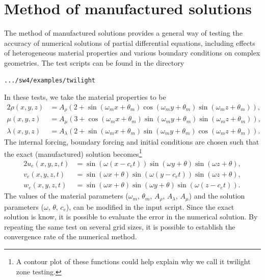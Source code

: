 \documentclass[11pt]{report}
\begin{document}
\section{Method of manufactured solutions}\label{sec:twilight}

The method of manufactured solutions provides a general way of testing the accuracy of numerical
solutions of partial differential equations, including effects of heterogeneous material properties
and various boundary conditions on complex geometries. The test scripts can be found in the
directory
\begin{verbatim}
.../sw4/examples/twilight
\end{verbatim}
In these tests, we take the material properties to be
\begin{alignat*}{2}
\rho(x,y,z) &= A_\rho \left( 2 + \sin(\omega_m x + \theta_m) \cos(\omega_m y + \theta_m)
\sin(\omega_m z + \theta_m) \right),\\ 
\mu(x,y,z) &=  A_\mu \left( 3 + \cos(\omega_m x + \theta_m) \sin(\omega_m y + \theta_m)
\sin(\omega_m z + \theta_m) \right),\\ 
\lambda(x,y,z) &=  A_\lambda \left( 2 + \sin(\omega_m x + \theta_m) \sin(\omega_m y + \theta_m)
\cos(\omega_m z + \theta_m) \right).
\end{alignat*}
The internal forcing, boundary forcing and initial conditions are chosen such that the exact
(manufactured) solution becomes\footnote{A contour plot of these functions could help explain why we
  call it twilight zone testing.}
\begin{alignat*}{2}
u_e(x,y,z,t) &= \sin(\omega(x-c_e t)) \sin(\omega y + \theta) \sin(\omega z + \theta), \\
v_e(x,y,z,t) &= \sin(\omega x + \theta) \sin(\omega( y - c_e t)) \sin(\omega z + \theta), \\
w_e(x,y,z,t) &= \sin(\omega x + \theta) \sin(\omega y + \theta) \sin(\omega( z - c_e t)). 
\end{alignat*}
The values of the material parameters ($\omega_m$, $\theta_m$, $A_\rho$, $A_\lambda$, $A_\mu$) and
the solution parameters ($\omega$, $\theta$, $c_e$), can be modified in the input script. Since the
exact solution is know, it is possible to evaluate the error in the numerical solution. By repeating
the same test on several grid sizes, it is possible to establish the convergence rate of the
numerical method.
\end{document}
